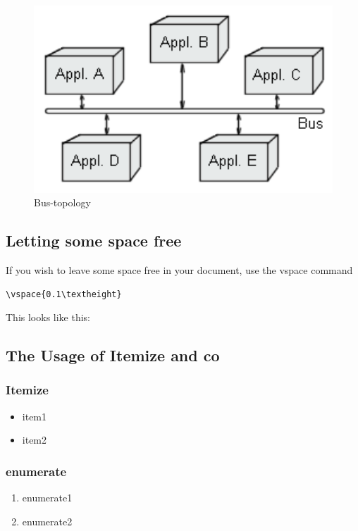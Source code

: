 \documentclass[12pt]{article}
\begin{document}
\begin{figure}[here!]
\begin{minipage}[h]{0.3\textwidth}
    \label{fig:eai1}
\end{minipage}
\begin{minipage}[h]{0.3\textwidth}
\centering
    \includegraphics[width=1.0\textwidth]{images/eai2.png}
    \caption{Bus-topology}
    \label{fig:eai2}
\end{minipage}
\end{figure}
\FloatBarrier
\subsection{Letting some space free}
If you wish to leave some space free in your document, use the vspace command
\begin{lstlisting}
\vspace{0.1\textheight}
\end{lstlisting}
This looks like this:
\vspace{0.1\textheight}
\subsection{The Usage of Itemize and co}
\subsubsection{Itemize}
\begin{itemize}
\item item1
\item item2
\end{itemize}
\subsubsection{enumerate}
\begin{enumerate}
\item enumerate1
\item enumerate2
\end{enumerate}
\end{document}

